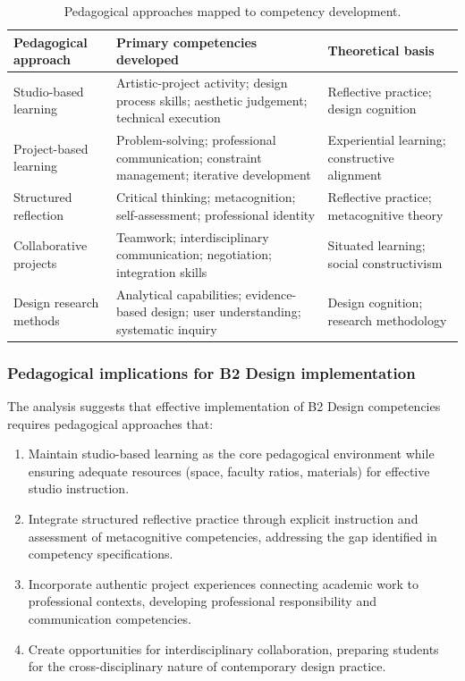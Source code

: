 \documentclass[ed]{acnsart}
\begin{document}
	\begin{table}[htbp]
		\centering
		\caption{Pedagogical approaches mapped to competency development.}
		\label{tab:pedagogy-competency}
		\small
		\begin{tabularx}{\textwidth}{@{}lXp{3.2cm}@{}}
			\toprule
			\hfill \textbf{Pedagogical approach} & \hfil \textbf{Primary competencies developed} & \hfil \textbf{Theoretical basis} \\
			\midrule
			Studio-based learning & Artistic-project activity; design process skills; aesthetic judgement; technical execution & Reflective practice; design cognition \\
			\addlinespace
			Project-based learning & Problem-solving; professional communication; constraint management; iterative development & Experiential learning; constructive alignment \\
			\addlinespace
			Structured reflection & Critical thinking; metacognition; self-assessment; professional identity & Reflective practice; metacognitive theory \\
			\addlinespace
			Collaborative projects & Teamwork; interdisciplinary communication; negotiation; integration skills & Situated learning; social constructivism \\
			\addlinespace
			Design research methods & Analytical capabilities; evidence-based design; user understanding; systematic inquiry & Design cognition; research methodology \\
			\bottomrule
		\end{tabularx}
	\end{table}
	
	\subsubsection{Pedagogical implications for B2 Design implementation}
	
	The analysis suggests that effective implementation of B2 Design competencies requires pedagogical approaches that:
	
	\begin{enumerate}
		\item Maintain studio-based learning as the core pedagogical environment while ensuring adequate resources (space, faculty ratios, materials) for effective studio instruction.
		\item Integrate structured reflective practice through explicit instruction and assessment of metacognitive competencies, addressing the gap identified in competency specifications.
		\item Incorporate authentic project experiences connecting academic work to professional contexts, developing professional responsibility and communication competencies.
		\item Create opportunities for interdisciplinary collaboration, preparing students for the cross-disciplinary nature of contemporary design practice.
	\end{enumerate}
	
\end{document}
